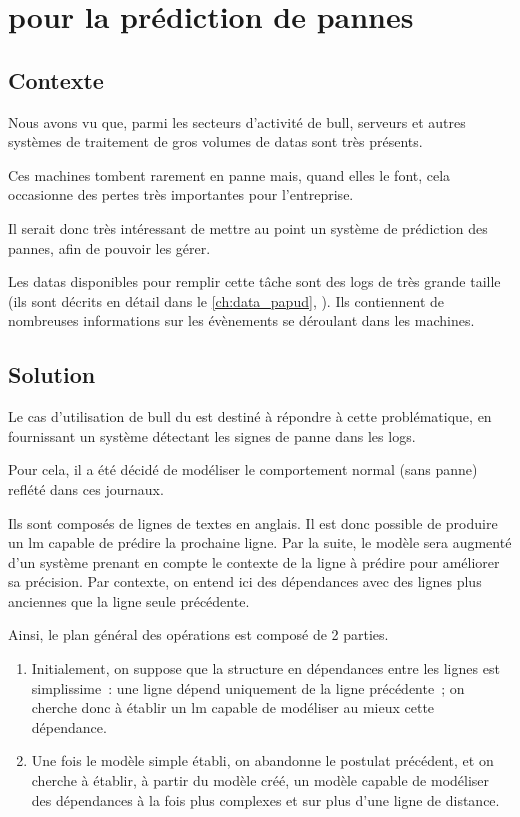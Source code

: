 \chapter{ pour la prédiction de pannes\label{ch:project_papud}}
\section{Contexte}
Nous avons vu que, parmi les secteurs d'activité de \gls{bull}, serveurs et autres systèmes de traitement de gros volumes de \glspl{data} sont très présents.

Ces machines tombent rarement en panne mais, quand elles le font, cela occasionne des pertes très importantes pour l'entreprise.

Il serait donc très intéressant de mettre au point un système de prédiction des pannes, afin de pouvoir les gérer.

Les \glspl{data} disponibles pour remplir cette tâche sont des \glspl{log}  de très grande taille (ils sont décrits en détail dans le \autoref{ch:data_papud}, ).
Ils contiennent de nombreuses informations sur les évènements se déroulant dans les machines.

\section{Solution}\label{sec:solution}

Le cas d'utilisation de \gls{bull} du  est destiné à répondre à cette problématique, en fournissant un système détectant les signes de panne dans les \glspl{log}.

Pour cela, il a été décidé de modéliser le comportement normal (sans panne) reflété dans ces journaux.

Ils sont composés de lignes de textes en anglais. Il est donc possible de produire un \gls{lm} capable de prédire la prochaine ligne.
Par la suite, le modèle sera augmenté d'un système prenant en compte le contexte de la ligne à prédire pour améliorer sa précision.
Par contexte, on entend ici des dépendances avec des lignes plus anciennes que la ligne seule précédente.

Ainsi, le plan général des opérations est composé de 2 parties.
\begin{enumerate}
	\item Initialement, on suppose que la structure en dépendances entre les lignes est simplissime~: une ligne dépend uniquement de la ligne précédente~; on cherche donc à établir un \gls{lm} capable de modéliser au mieux cette dépendance.
	\item Une fois le modèle simple établi, on abandonne le postulat précédent, et on cherche à établir, à partir du modèle créé, un modèle capable de modéliser des dépendances à la fois plus complexes et sur plus d'une ligne de distance.
\end{enumerate}
\hspace{1em}

